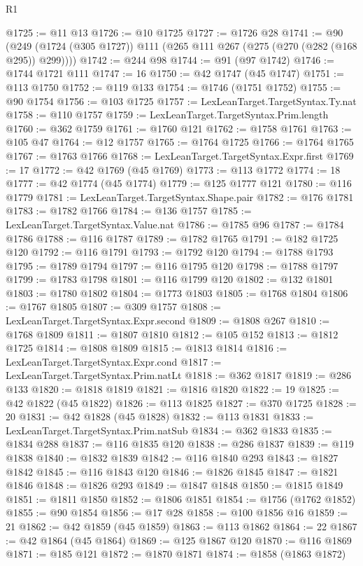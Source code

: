 \begin{lexlean}{R1}
\begin{coremodule}
@1725 := @11 @13
@1726 := @10 @1725
@1727 := @1726 @28
@1741 := @90 (@249 (@1724 (@305 @1727)) @111 (@265 @111 @267 (@275 (@270 (@282 (@168 @295)) @299))))
@1742 := @244 @98
@1744 := @91 (@97 @1742)
@1746 := @1744 @1721 @111
@1747 := 16
@1750 := @42 @1747 (@45 @1747)
@1751 := @113 @1750
@1752 := @119 @133
@1754 := @1746 (@1751 @1752)
@1755 := @90 @1754
@1756 := @103 @1725
@1757 := LexLeanTarget.TargetSyntax.Ty.nat
@1758 := @110 @1757
@1759 := LexLeanTarget.TargetSyntax.Prim.length
@1760 := @362 @1759
@1761 := @1760 @121
@1762 := @1758 @1761
@1763 := @105 @47
@1764 := @12 @1757
@1765 := @1764 @1725
@1766 := @1764 @1765
@1767 := @1763 @1766
@1768 := LexLeanTarget.TargetSyntax.Expr.first
@1769 := 17
@1772 := @42 @1769 (@45 @1769)
@1773 := @113 @1772
@1774 := 18
@1777 := @42 @1774 (@45 @1774)
@1779 := @125 @1777 @121
@1780 := @116 @1779
@1781 := LexLeanTarget.TargetSyntax.Shape.pair
@1782 := @176 @1781
@1783 := @1782 @1766
@1784 := @136 @1757
@1785 := LexLeanTarget.TargetSyntax.Value.nat
@1786 := @1785 @96
@1787 := @1784 @1786
@1788 := @116 @1787
@1789 := @1782 @1765
@1791 := @182 @1725 @120
@1792 := @116 @1791
@1793 := @1792 @120
@1794 := @1788 @1793
@1795 := @1789 @1794
@1797 := @116 @1795 @120
@1798 := @1788 @1797
@1799 := @1783 @1798
@1801 := @116 @1799 @120
@1802 := @132 @1801
@1803 := @1780 @1802
@1804 := @1773 @1803
@1805 := @1768 @1804
@1806 := @1767 @1805
@1807 := @309 @1757
@1808 := LexLeanTarget.TargetSyntax.Expr.second
@1809 := @1808 @267
@1810 := @1768 @1809
@1811 := @1807 @1810
@1812 := @105 @152
@1813 := @1812 @1725
@1814 := @1808 @1809
@1815 := @1813 @1814
@1816 := LexLeanTarget.TargetSyntax.Expr.cond
@1817 := LexLeanTarget.TargetSyntax.Prim.natLt
@1818 := @362 @1817
@1819 := @286 @133
@1820 := @1818 @1819
@1821 := @1816 @1820
@1822 := 19
@1825 := @42 @1822 (@45 @1822)
@1826 := @113 @1825
@1827 := @370 @1725
@1828 := 20
@1831 := @42 @1828 (@45 @1828)
@1832 := @113 @1831
@1833 := LexLeanTarget.TargetSyntax.Prim.natSub
@1834 := @362 @1833
@1835 := @1834 @288
@1837 := @116 @1835 @120
@1838 := @286 @1837
@1839 := @119 @1838
@1840 := @1832 @1839
@1842 := @116 @1840 @293
@1843 := @1827 @1842
@1845 := @116 @1843 @120
@1846 := @1826 @1845
@1847 := @1821 @1846
@1848 := @1826 @293
@1849 := @1847 @1848
@1850 := @1815 @1849
@1851 := @1811 @1850
@1852 := @1806 @1851
@1854 := @1756 (@1762 @1852)
@1855 := @90 @1854
@1856 := @17 @28
@1858 := @100 @1856 @16
@1859 := 21
@1862 := @42 @1859 (@45 @1859)
@1863 := @113 @1862
@1864 := 22
@1867 := @42 @1864 (@45 @1864)
@1869 := @125 @1867 @120
@1870 := @116 @1869
@1871 := @185 @121
@1872 := @1870 @1871
@1874 := @1858 (@1863 @1872)

\end{coremodule}
\end{lexlean}
